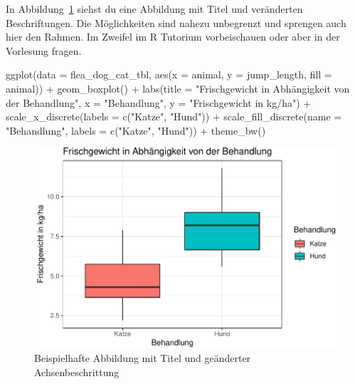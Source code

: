 \documentclass[
  letterpaper,
]{scrbook}
\newenvironment{Shaded}{\begin{snugshade}}{\end{snugshade}}
\newcommand{\AttributeTok}[1]{\textcolor[rgb]{0.40,0.45,0.13}{#1}}
\newcommand{\FunctionTok}[1]{\textcolor[rgb]{0.28,0.35,0.67}{#1}}
\newcommand{\NormalTok}[1]{\textcolor[rgb]{0.00,0.23,0.31}{#1}}
\newcommand{\SpecialCharTok}[1]{\textcolor[rgb]{0.37,0.37,0.37}{#1}}
\newcommand{\StringTok}[1]{\textcolor[rgb]{0.13,0.47,0.30}{#1}}
\begin{document}
{}

In Abbildung~\ref{fig-labels-0} siehst du eine Abbildung mit Titel und
veränderten Beschriftungen. Die Möglichkeiten sind nahezu unbegrenzt und
sprengen auch hier den Rahmen. Im Zweifel im R Tutorium vorbeischauen
oder aber in der Vorlesung fragen.

\begin{Shaded}
\begin{Highlighting}[]
\FunctionTok{ggplot}\NormalTok{(}\AttributeTok{data =}\NormalTok{ flea\_dog\_cat\_tbl, }\FunctionTok{aes}\NormalTok{(}\AttributeTok{x =}\NormalTok{ animal, }\AttributeTok{y =}\NormalTok{ jump\_length,}
                                    \AttributeTok{fill =}\NormalTok{ animal)) }\SpecialCharTok{+}
  \FunctionTok{geom\_boxplot}\NormalTok{() }\SpecialCharTok{+}
  \FunctionTok{labs}\NormalTok{(}\AttributeTok{title =} \StringTok{"Frischgewicht in Abhängigkeit von der Behandlung"}\NormalTok{,}
       \AttributeTok{x =} \StringTok{"Behandlung"}\NormalTok{, }\AttributeTok{y =} \StringTok{"Frischgewicht in kg/ha"}\NormalTok{) }\SpecialCharTok{+}
  \FunctionTok{scale\_x\_discrete}\NormalTok{(}\AttributeTok{labels =} \FunctionTok{c}\NormalTok{(}\StringTok{"Katze"}\NormalTok{, }\StringTok{"Hund"}\NormalTok{)) }\SpecialCharTok{+}
  \FunctionTok{scale\_fill\_discrete}\NormalTok{(}\AttributeTok{name =} \StringTok{"Behandlung"}\NormalTok{, }\AttributeTok{labels =} \FunctionTok{c}\NormalTok{(}\StringTok{"Katze"}\NormalTok{, }\StringTok{"Hund"}\NormalTok{)) }\SpecialCharTok{+}
  \FunctionTok{theme\_bw}\NormalTok{() }
\end{Highlighting}
\end{Shaded}

\begin{figure}[H]

{\centering \includegraphics{./eda-ggplot_files/figure-pdf/fig-labels-0-1.pdf}

}

\caption{\label{fig-labels-0}Beispielhafte Abbildung mit Titel und
geänderter Achsenbeschrittung}

\end{figure}
\end{document}
